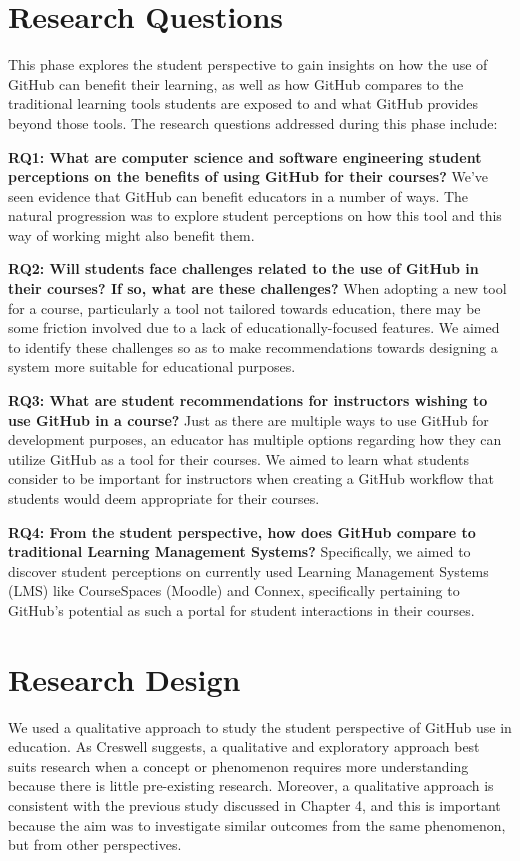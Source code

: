 \section{Research Questions}
This phase explores the student perspective to gain insights on how the use of GitHub can benefit their learning, as well as how GitHub compares to the traditional learning tools students are exposed to and what GitHub provides beyond those tools. The research questions addressed during this phase include:

\bigskip
\textbf{RQ1: What are computer science and software engineering student perceptions on the benefits of using GitHub for their courses?} We've seen evidence that GitHub can benefit educators in a number of ways. The natural progression was to explore student perceptions on how this tool and this way of working might also benefit them.

\bigskip
\textbf{RQ2: Will students face challenges related to the use of GitHub in their courses? If so, what are these challenges?} When adopting a new tool for a course, particularly a tool not tailored towards education, there may be some friction involved due to a lack of educationally-focused features. We aimed to identify these challenges so as to make recommendations towards designing a system more suitable for educational purposes.

\bigskip
\textbf{RQ3: What are student recommendations for instructors wishing to use GitHub in a course?} Just as there are multiple ways to use GitHub for development purposes, an educator has multiple options regarding how they can utilize GitHub as a tool for their courses. We aimed to learn what students consider to be important for instructors when creating a GitHub workflow that students would deem appropriate for their courses.

\bigskip
\textbf{RQ4: From the student perspective, how does GitHub compare to traditional Learning Management Systems?} Specifically, we aimed to discover student perceptions on currently used Learning Management Systems (LMS) like CourseSpaces (Moodle) and Connex, specifically pertaining to GitHub's potential as such a portal for student interactions in their courses.

\section{Research Design}
We used a qualitative approach to study the student perspective of GitHub use in education. As Creswell \cite{creswell2013research} suggests, a qualitative and exploratory approach best suits research when a concept or phenomenon requires more understanding because there is little pre-existing research. Moreover, a qualitative approach is consistent with the previous study discussed in Chapter 4, and this is important because the aim was to investigate similar outcomes from the same phenomenon, but from other perspectives. %

